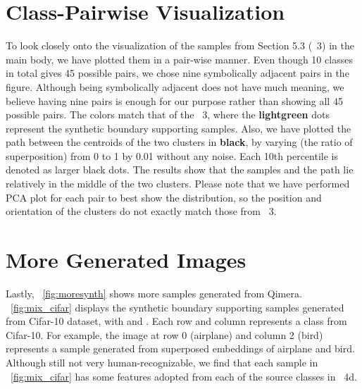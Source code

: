 \documentclass{article}
\newcommand{\aname}{Qimera\xspace}
\begin{document}
{\begin{comment}
\end{comment}




\section{Class-Pairwise Visualization}
To look closely onto the visualization of the samples from Section 5.3 (\figurename~3) in the main body, we have plotted them in a pair-wise manner.
Even though 10 classes in total gives 45 possible pairs, we chose nine symbolically adjacent pairs in the figure.
Although being symbolically adjacent does not have much meaning, we believe having nine pairs is enough for our purpose rather than showing all 45 possible pairs.
The colors match that of the \figurename~3, where the \textbf{{\color{emerald}lightgreen}} dots represent the synthetic boundary supporting samples. 
Also, we have plotted the path between the centroids of the two clusters in \textbf{black}, by varying  (the ratio of superposition) from 0 to 1 by 0.01 without any noise.
Each 10th percentile is denoted as larger black dots.
The results show that the samples and the path lie relatively in the middle of the two clusters.
Please note that we have performed PCA plot for each pair to best show the distribution, so the position and orientation of the clusters do not exactly match those from \figurename~3.








\begin{comment}
\subsection{Feature Space Distance}
\tablename~\ref{tab:distance} shows the distance, measured in a piecewise linear manner, with 100 points between the curves. 
The average column shows the average of all 45 pairs, not just the example 9 pairs we display as the examples.
It is clearly shown that the distance between the clusters in the feature space decreases with disentanglement mapping by @\%, although both types of curves are moderately flat.
\end{comment}


\section{More Generated Images}
Lastly, \figurename~\ref{fig:moresynth} shows more samples generated from \aname. 
\figurename~\ref{fig:mix_cifar} displays the synthetic boundary supporting samples generated from Cifar-10 dataset, with  and .
Each row and column represents a class from Cifar-10.
For example, the image at row 0 (airplane) and column 2 (bird) represents a sample generated from superposed embeddings of airplane and bird.
Although still not very human-recognizable, we find that each sample in \figurename~\ref{fig:mix_cifar} has some features adopted from each of the source classes in \figurename~4d.

}
\end{document}

